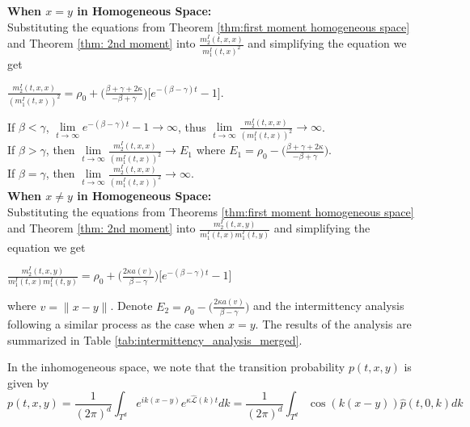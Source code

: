 \documentclass[sn-basic]{sn-jnl}%
\theoremstyle{thmstyleone}%
\theoremstyle{thmstyletwo}%
\theoremstyle{thmstylethree}%
\numberwithin{equation}{theorem}
\begin{document}
\textbf{When $x=y$ in Homogeneous Space:}\\
Substituting the equations from Theorem \ref{thm:first moment homogeneous space} and Theorem \ref{thm: 2nd moment} into $\displaystyle \frac{m_{2}^{I}(t,x,x)}{m_{1}^{I}(t,x)^2}$ and simplifying the equation we get
\begin{center}
$\displaystyle \frac{m_{2}^{I}(t,x,x)}{(m_{1}^{I}(t,x))^{2}} = \rho_{0} + \Big(\displaystyle \frac{\beta + \gamma + 2\kappa}{-\beta + \gamma}\Big) \Big[ e^{\displaystyle -(\beta-\gamma)t} - 1 \Big]$.
\end{center}

If $\beta < \gamma$, $\lim\limits_{t \rightarrow \infty} e^{\displaystyle -(\beta-\gamma)t} - 1 \rightarrow \infty$, thus $\lim\limits_{t \rightarrow \infty} \displaystyle \frac{m_{2}^{I}(t,x,x)}{(m_{1}^{I}(t,x))^{2}} \rightarrow \infty$.\\

If $\beta > \gamma$,  then $\lim\limits_{t \rightarrow \infty} \displaystyle \frac{m_{2}^{I}(t,x,x)}{(m_{1}^{I}(t,x))^{2}} \rightarrow E_{1}$ where $E_{1} = \rho_{0} - \Big(\displaystyle \frac{\beta + \gamma + 2\kappa}{-\beta + \gamma}\Big)$.\\

If $\beta=\gamma$, then $\lim\limits_{t \rightarrow \infty} \displaystyle \frac{m_{2}^{I}(t,x,x)}{(m_{1}^{I}(t,x))^{2}} \rightarrow \infty$.\\

\textbf{When $x \neq y$ in Homogeneous Space:}\\
Substituting the equations from Theorems \ref{thm:first moment homogeneous space} and Theorem \ref{thm: 2nd moment} into $\displaystyle \frac{m_{2}^{I}(t,x,y)}{m_{1}^{I}(t,x)m_{1}^{I}(t,y)}$ and simplifying the equation we get
\begin{center}
$\displaystyle \frac{m_{2}^{I}(t,x,y)}{m_{1}^{I}(t,x)m_{1}^{I}(t,y)} = \rho_{0} + \Big(\displaystyle \frac{2\kappa a(v)}{\beta - \gamma}\Big) \Big[ e^{\displaystyle -(\beta-\gamma)t} - 1 \Big]$
\end{center}
where $v=\|x-y\|$.
Denote $ E_{2} = \rho_{0} - \Big(\displaystyle \frac{ 2\kappa a(v)}{\beta - \gamma}\Big)$ and the intermittency analysis following a similar process as the case when $x=y$. The results of the analysis are summarized in Table \ref{tab:intermittency_analysis_merged}. 




In the inhomogeneous space, we note that the transition probability $p(t, x, y)$ is given by
$$
p(t, x, y)=\frac{1}{(2 \pi)^d} \int_{T^d} e^{i k(x-y)} e^{\kappa \hat{\mathcal{L}}(k) t} d k=\frac{1}{(2 \pi)^d} \int_{T^d} \cos (k(x-y)) \hat{p}(t, 0, k) d k
$$
\end{document}
